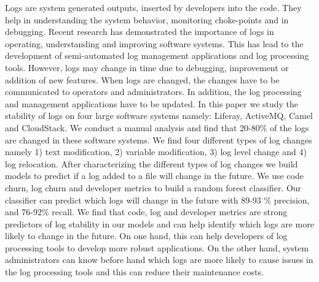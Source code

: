 Logs are system generated outputs, inserted by developers into the code. They help in understanding the system behavior, monitoring choke-points and in debugging. Recent research has demonstrated the importance of logs in operating, understanding and improving software systems. This has lead to the development of semi-automated log management applications and log processing tools. However, logs may change in time due to debugging, improvement or addition of new features. When logs are changed, the changes have to be communicated to operators and administrators. In addition, the log processing and management applications have to be updated. In this paper we study the stability of logs on four large software systems namely: Liferay, ActiveMQ, Camel and CloudStack. We conduct a manual analysis and find that 20-80\% of the logs are changed in these software systems. We find four different types of log changes namely 1) text modification, 2) variable modification, 3) log level change and 4) log relocation. After characterizing the different types of log changes we build models to predict if a log added to a file will change in the future. We use code churn, log churn and developer metrics to build a random forest classifier. Our classifier can predict which logs will change in the future with 89-93 \% precision, and 76-92\% recall.  We find that code, log and developer metrics are strong predictors of log stability in our models and can help identify which logs are more likely to change in the future. On one hand, this can help developers of log processing tools to develop more robust applications. On the other hand, system administrators can know before hand which logs are more likely to cause issues in the log processing tools and this can reduce their maintenance costs.
